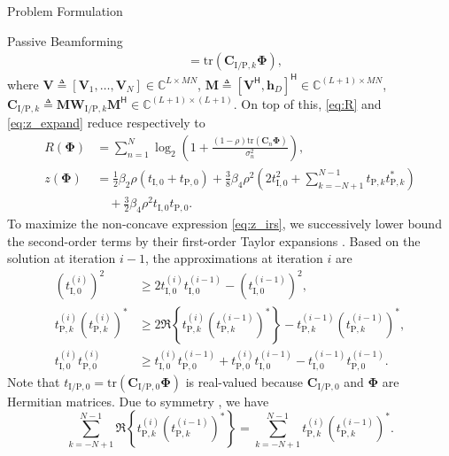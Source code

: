 \begin{section}{Problem Formulation}
\begin{subsection}{Passive Beamforming}
\begin{align}
			& = \mathrm{tr}(\mathbf{C}_{\mathrm{I/P},k}\mathbf{\Phi})\label{eq:t_k},
		\end{align}
		where $\mathbf{V} \triangleq [\mathbf{V}_1,\dots,\mathbf{V}_N] \in \mathbb{C}^{L \times MN}$, $\mathbf{M} \triangleq [\mathbf{V}^\mathsf{H}, \mathbf{h}_{D}]^\mathsf{H} \in \mathbb{C}^{(L+1) \times MN}$, $\mathbf{C}_{\mathrm{I/P},k} \triangleq \mathbf{M}\mathbf{W}_{\mathrm{I/P},k}\mathbf{M}^\mathsf{H} \in \mathbb{C}^{(L+1)\times(L+1)}$. On top of this, \eqref{eq:R} and \eqref{eq:z_expand} reduce respectively to
		\begin{align}
			R(\mathbf{\Phi})
			& = \sum_{n=1}^{N}{\log_2\left(1+\frac{(1-\rho)\mathrm{tr}(\mathbf{C}_n\mathbf{\Phi})}{\sigma_n^2}\right)},\label{eq:R_irs}\\
			z(\mathbf{\Phi})
			& = \frac{1}{2}{\beta_2}{\rho}(t_{\mathrm{I},0}+t_{\mathrm{P},0}) + \frac{3}{8}{\beta_4}{\rho^2} \left(2t_{\mathrm{I},0}^2 + \sum_{k=-N+1}^{N-1}{t_{\mathrm{P},k}t_{\mathrm{P},k}^*}\right)\nonumber\\
			& \quad + \frac{3}{2}{\beta_4}{\rho^2}t_{\mathrm{I},0}t_{\mathrm{P},0}.\label{eq:z_irs}
		\end{align}
		To maximize the non-concave expression \eqref{eq:z_irs}, we successively lower bound the second-order terms by their first-order Taylor expansions \cite{Adali2010}. Based on the solution at iteration $i - 1$, the approximations at iteration $i$ are
		\begin{align}
			(t_{\mathrm{I},0}^{(i)})^2
			& \ge 2 t_{\mathrm{I},0}^{(i)}t_{\mathrm{I},0}^{(i-1)} - (t_{\mathrm{I},0}^{(i-1)})^2,\label{eq:taylor_1}\\
			t_{\mathrm{P},k}^{(i)} (t_{\mathrm{P},k}^{(i)})^*
			& \ge 2 \Re\left\{t_{\mathrm{P},k}^{(i)} (t_{\mathrm{P},k}^{(i-1)})^*\right\} - t_{\mathrm{P},k}^{(i-1)} (t_{\mathrm{P},k}^{(i-1)})^*,\label{eq:taylor_2}\\
			t_{\mathrm{I},0}^{(i)} t_{\mathrm{P},0}^{(i)}
			& \ge t_{\mathrm{I},0}^{(i)} t_{\mathrm{P},0}^{(i-1)} + t_{\mathrm{P},0}^{(i)} t_{\mathrm{I},0}^{(i-1)} - t_{\mathrm{I},0}^{(i-1)} t_{\mathrm{P},0}^{(i-1)}.\label{eq:taylor_3}
		\end{align}
		Note that $t_{\mathrm{I/P},0}=\mathrm{tr}(\mathbf{C}_{\mathrm{I/P},0}\mathbf{\Phi})$ is real-valued because $\mathbf{C}_{\mathrm{I/P},0}$ and $\mathbf{\Phi}$ are Hermitian matrices. Due to symmetry \cite{Golub2013}, we have
		\begin{equation}\label{eq:coupled_terms}
			\sum_{k=-N+1}^{N-1} \Re\left\{t_{\mathrm{P},k}^{(i)} (t_{\mathrm{P},k}^{(i-1)})^*\right\} = \sum_{k=-N+1}^{N-1} t_{\mathrm{P},k}^{(i)} (t_{\mathrm{P},k}^{(i-1)})^*.

\end{equation}
\end{subsection}
\end{section}
